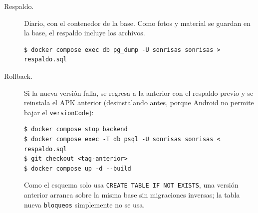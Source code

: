 \begin{description}
	\item[Respaldo.] Diario, con el contenedor de la base. Como fotos y material se guardan en la base, el respaldo incluye los archivos.
\begin{lstlisting}[style=terminal]
$ docker compose exec db pg_dump -U sonrisas sonrisas > respaldo.sql
\end{lstlisting}
	\item[Rollback.] Si la nueva versión falla, se regresa a la anterior con el respaldo previo y se reinstala el APK anterior (desinstalando antes, porque Android no permite bajar el \texttt{versionCode}):
\begin{lstlisting}[style=terminal]
$ docker compose stop backend
$ docker compose exec -T db psql -U sonrisas sonrisas < respaldo.sql
$ git checkout <tag-anterior>
$ docker compose up -d --build
\end{lstlisting}
	Como el esquema solo usa \texttt{CREATE TABLE IF NOT EXISTS}, una versión anterior arranca sobre la misma base sin migraciones inversas; la tabla nueva \texttt{bloqueos} simplemente no se usa.
\end{description}
